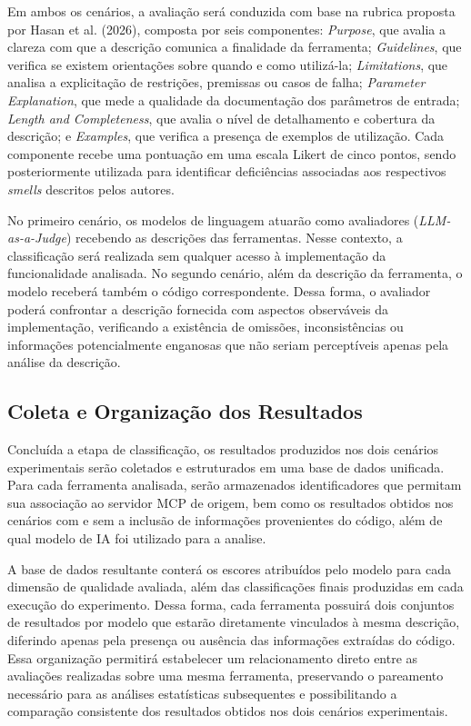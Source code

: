 Em ambos os cenários, a avaliação será conduzida com base na rubrica proposta por Hasan et al. (2026)\nocite{2026arXiv260214878M}, composta por seis componentes: \textit{Purpose}, que avalia a clareza com que a descrição comunica a finalidade da ferramenta; \textit{Guidelines}, que verifica se existem orientações sobre quando e como utilizá-la; \textit{Limitations}, que analisa a explicitação de restrições, premissas ou casos de falha; \textit{Parameter Explanation}, que mede a qualidade da documentação dos parâmetros de entrada; \textit{Length and Completeness}, que avalia o nível de detalhamento e cobertura da descrição; e \textit{Examples}, que verifica a presença de exemplos de utilização. Cada componente recebe uma pontuação em uma escala Likert de cinco pontos, sendo posteriormente utilizada para identificar deficiências associadas aos respectivos \textit{smells} descritos pelos autores.

No primeiro cenário, os modelos de linguagem atuarão como avaliadores (\textit{LLM-as-a-Judge}) recebendo as descrições das ferramentas. Nesse contexto, a classificação será realizada sem qualquer acesso à implementação da funcionalidade analisada. No segundo cenário, além da descrição da ferramenta, o modelo receberá também o código correspondente. Dessa forma, o avaliador poderá confrontar a descrição fornecida com aspectos observáveis da implementação, verificando a existência de omissões, inconsistências ou informações potencialmente enganosas que não seriam perceptíveis apenas pela análise da descrição.


\subsection{Coleta e Organização dos Resultados}

Concluída a etapa de classificação, os resultados produzidos nos dois cenários experimentais serão coletados e estruturados em uma base de dados unificada. Para cada ferramenta analisada, serão armazenados identificadores que permitam sua associação ao servidor MCP de origem, bem como os resultados obtidos nos cenários com e sem a inclusão de informações provenientes do código, além de qual modelo de IA foi utilizado para a analise.

A base de dados resultante conterá os escores atribuídos pelo modelo para cada dimensão de qualidade avaliada, além das classificações finais produzidas em cada execução do experimento. Dessa forma, cada ferramenta possuirá dois conjuntos de resultados por modelo que estarão diretamente vinculados à mesma descrição, diferindo apenas pela presença ou ausência das informações extraídas do código. Essa organização permitirá estabelecer um relacionamento direto entre as avaliações realizadas sobre uma mesma ferramenta, preservando o pareamento necessário para as análises estatísticas subsequentes e possibilitando a comparação consistente dos resultados obtidos nos dois cenários experimentais.

